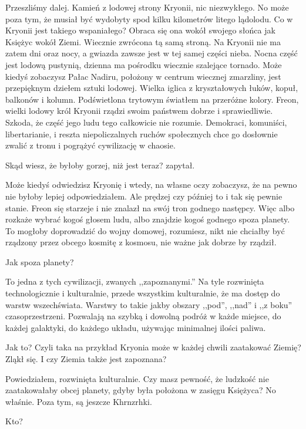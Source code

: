 Przeszliśmy dalej. Kamień z lodowej strony Kryonii, nic niezwykłego. 
No może poza tym, że musiał być wydobyty spod kilku kilometrów litego lądolodu.
Co w Kryonii jest takiego wspaniałego? Obraca się ona wokół swojego słońca jak Księżyc wokół Ziemi. 
Wiecznie zwrócona tą samą stroną.
Na Kryonii nie ma zatem dni oraz nocy, a gwiazda zawsze jest w tej samej części nieba.
Nocna część jest lodową pustynią, dzienna ma pośrodku wiecznie szalejące tornado.
Może kiedyś zobaczysz Pałac Nadiru, położony w centrum wiecznej zmarzliny, jest przepięknym dziełem sztuki lodowej.
Wielka iglica z kryształowych łuków, kopuł, balkonów i kolumn.
Podświetlona trytowym światłem na przeróżne kolory.
Freon, wielki lodowy król Kryonii rządzi swoim państwem dobrze i sprawiedliwie.
Szkoda, że część jego ludu tego całkowicie nie rozumie. 
Demokraci, komuniści, libertarianie, i reszta niepoliczalnych ruchów społecznych chce go dosłownie zwalić z tronu i pogrążyć cywilizację w chaosie.

\ds{} Skąd wiesz, że byłoby gorzej, niż jest teraz? \dm{} zapytał. \de{}

\ds{} Może kiedyś odwiedzisz Kryonię i wtedy, na własne oczy zobaczysz, że na pewno nie byłoby lepiej \dm{} odpowiedziałem. \dm{}
Ale prędzej czy później to i tak się pewnie stanie. Freon się starzeje i nie znalazł na swój tron godnego następcy. 
Więc albo rozkaże wybrać kogoś głosem ludu, albo znajdzie kogoś godnego spoza planety. To mogłoby doprowadzić do wojny domowej, 
rozumiesz, nikt nie chciałby być rządzony przez obcego kosmitę z kosmosu, nie ważne jak dobrze by rządził. \de{}

\ds{} Jak spoza planety? \de{}

\ds{} To jedna z tych cywilizacji, zwanych ,,zapoznanymi.'' Na tyle rozwinięta technologicznie i kulturalnie, przede wszystkim kulturalnie, 
że ma dostęp do warstw wszechświata. Warstwy to takie jakby obszary ,,pod'', ,,nad'' i ,,z boku'' czasoprzestrzeni.
Pozwalają na szybką i dowolną podróż w każde miejsce, do każdej galaktyki, do każdego układu, używając minimalnej ilości paliwa. \de{}

\ds{} Jak to? Czyli taka na przykład Kryonia może w każdej chwili zaatakować Ziemię? \dm{} Zląkł się. \dm{} I czy Ziemia także jest zapoznana? \de{}

\ds{} Powiedziałem, rozwinięta kulturalnie. Czy masz pewność, że ludzkość nie zaatakowałaby obcej planety, gdyby była położona w zasięgu Księżyca? 
No właśnie. Poza tym, są jeszcze Khrnzrhki. \de{}

\ds{} Kto? \de{}


